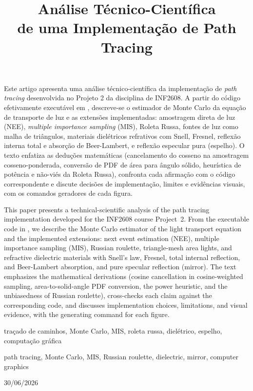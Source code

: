 \documentclass[portuguese]{sbcreviews-2025}%
\title[Análise Técnico-Científica de Path Tracing]{Análise Técnico-Científica\\de uma Implementação de Path Tracing}
\author[Yang Ricardo Barcellos Miranda]{
\affil{\textbf{Yang Ricardo Barcellos Miranda}~[\href{mailto:ymiranda@inf.puc-rio.br}{\nolinkurl{ymiranda@inf.puc-rio.br}}]}
}
\begin{document}
\begin{frontmatter}

\maketitle

\begin{abstract-pt}
Este artigo apresenta uma análise técnico-científica da implementação de \emph{path tracing} desenvolvida no Projeto 2 da disciplina de INF2608. A partir do código efetivamente executável em , descreve-se o estimador de Monte Carlo da equação de transporte de luz e as extensões implementadas: amostragem direta de luz (NEE), \emph{multiple importance sampling} (MIS), Roleta Russa, fontes de luz como malha de triângulos, materiais dielétricos refrativos com Snell, Fresnel, reflexão interna total e absorção de Beer-Lambert, e reflexão especular pura (espelho). O texto enfatiza as deduções matemáticas (cancelamento do cosseno na amostragem cosseno-ponderada, conversão de PDF de área para ângulo sólido, heurística de potência e não-viés da Roleta Russa), confronta cada afirmação com o código correspondente e discute decisões de implementação, limites e evidências visuais, com os comandos geradores de cada figura.
\end{abstract-pt}

\begin{abstract-en}
This paper presents a technical-scientific analysis of the path tracing implementation developed for the INF2608 course Project~2. From the executable code in , we describe the Monte Carlo estimator of the light transport equation and the implemented extensions: next event estimation (NEE), multiple importance sampling (MIS), Russian roulette, triangle-mesh area lights, and refractive dielectric materials with Snell's law, Fresnel, total internal reflection, and Beer-Lambert absorption, and pure specular reflection (mirror). The text emphasizes the mathematical derivations (cosine cancellation in cosine-weighted sampling, area-to-solid-angle PDF conversion, the power heuristic, and the unbiasedness of Russian roulette), cross-checks each claim against the corresponding code, and discusses implementation choices, limitations, and visual evidence, with the generating command for each figure.
\end{abstract-en}

\begin{pchaves}
traçado de caminhos, Monte Carlo, MIS, roleta russa, dielétrico, espelho, computação gráfica
\end{pchaves}

\begin{keywords}
path tracing, Monte Carlo, MIS, Russian roulette, dielectric, mirror, computer graphics
\end{keywords}

\begin{dates}
 30/06/2026
\end{dates}

\end{frontmatter}
\end{document}
